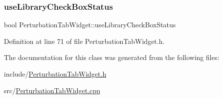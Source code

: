\subsubsection{\texorpdfstring{use\+Library\+Check\+Box\+Status}{useLibraryCheckBoxStatus}}
{\footnotesize\ttfamily bool Perturbation\+Tab\+Widget\+::use\+Library\+Check\+Box\+Status}



Definition at line 71 of file Perturbation\+Tab\+Widget.\+h.



The documentation for this class was generated from the following files\+:\begin{DoxyCompactItemize}
\item 
include/\hyperlink{_perturbation_tab_widget_8h}{Perturbation\+Tab\+Widget.\+h}\item 
src/\hyperlink{_perturbation_tab_widget_8cpp}{Perturbation\+Tab\+Widget.\+cpp}\end{DoxyCompactItemize}
